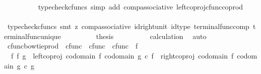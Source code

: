 \begin{isabellebody}
\ \ \ \ \ \ \ \ \isamarkupfalse%
\ {\isacharparenleft}{\kern0pt}typecheck{\isacharunderscore}{\kern0pt}cfuncs{\isacharcomma}{\kern0pt}\ simp\ add{\isacharcolon}{\kern0pt}\ comp{\isacharunderscore}{\kern0pt}associative{}\ left{\isacharunderscore}{\kern0pt}coproj{\isacharunderscore}{\kern0pt}cfunc{\isacharunderscore}{\kern0pt}coprod{\isacharparenright}{\kern0pt}\isanewline
\ \ \ \ \ \ \isamarkupfalse%
\ \isamarkupfalse%
\ {\isachardoublequoteopen}{\isachardot}{\kern0pt}{\isachardot}{\kern0pt}{\isachardot}{\kern0pt}\ {\isacharequal}{\kern0pt}\ {\isasymf}{\isachardoublequoteclose}\isanewline
\ \ \ \ \ \ \ \ \isamarkupfalse%
\ {\isacharparenleft}{\kern0pt}typecheck{\isacharunderscore}{\kern0pt}cfuncs{\isacharcomma}{\kern0pt}\ smt\ {\isacharparenleft}{\kern0pt}z{}{\isacharparenright}{\kern0pt}\ comp{\isacharunderscore}{\kern0pt}associative{}\ id{\isacharunderscore}{\kern0pt}right{\isacharunderscore}{\kern0pt}unit{}\ id{\isacharunderscore}{\kern0pt}type\ terminal{\isacharunderscore}{\kern0pt}func{\isacharunderscore}{\kern0pt}comp\ terminal{\isacharunderscore}{\kern0pt}func{\isacharunderscore}{\kern0pt}unique{\isacharparenright}{\kern0pt}\isanewline
\ \ \ \ \ \ \isamarkupfalse%
\ \isamarkupfalse%
\ {\isacharquery}{\kern0pt}thesis\isanewline
\ \ \ \ \ \ \ \ \isamarkupfalse%
\ calculation\ \isamarkupfalse%
\ auto\isanewline
\ \ \ \ \isamarkupfalse%
\isanewline
\ \ \isamarkupfalse%
\isanewline
{}\isamarkupfalse%
%
\endisatagproof
{\isafoldproof}%
%
\isadelimproof
%
\endisadelimproof
%
\isadelimdocument
%
\endisadelimdocument
%
\isatagdocument
%
\isamarkuptrue%
%
\endisatagdocument
{\isafolddocument}%
%
\isadelimdocument
%
\endisadelimdocument
{}\isamarkupfalse%
\ cfunc{\isacharunderscore}{\kern0pt}bowtie{\isacharunderscore}{\kern0pt}prod\ {\isacharcolon}{\kern0pt}{\isacharcolon}{\kern0pt}\ {\isachardoublequoteopen}cfunc\ {\isasymRightarrow}\ cfunc\ {\isasymRightarrow}\ cfunc{\isachardoublequoteclose}\ {\isacharparenleft}{\kern0pt}\ {\isachardoublequoteopen}{\isasymbowtie}\isactrlsub f{\isachardoublequoteclose}\ {}{}{\isacharparenright}{\kern0pt}\ \isanewline
\ \ {\isachardoublequoteopen}f\ {\isasymbowtie}\isactrlsub f\ g\ {\isacharequal}{\kern0pt}\ {\isacharparenleft}{\kern0pt}{\isacharparenleft}{\kern0pt}left{\isacharunderscore}{\kern0pt}coproj\ {\isacharparenleft}{\kern0pt}codomain\ f{\isacharparenright}{\kern0pt}\ {\isacharparenleft}{\kern0pt}codomain\ g{\isacharparenright}{\kern0pt}{\isacharparenright}{\kern0pt}\ {\isasymcirc}\isactrlsub c\ f{\isacharparenright}{\kern0pt}\ {\isasymamalg}\ {\isacharparenleft}{\kern0pt}{\isacharparenleft}{\kern0pt}right{\isacharunderscore}{\kern0pt}coproj\ {\isacharparenleft}{\kern0pt}codomain\ f{\isacharparenright}{\kern0pt}\ {\isacharparenleft}{\kern0pt}codomain\ g{\isacharparenright}{\kern0pt}{\isacharparenright}{\kern0pt}\ {\isasymcirc}\isactrlsub c\ g{\isacharparenright}{\kern0pt}{\isachardoublequoteclose}\isanewline

\end{isabellebody}
